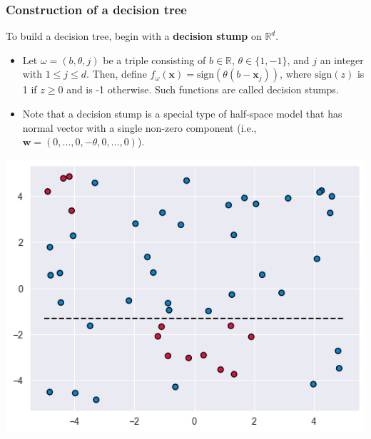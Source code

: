 \documentclass[smaller]{beamer}
\theoremstyle{example}
\newcommand{\x}{\textbf{x}}
\begin{document}
\begin{frame}
    \frametitle{Construction of a decision tree}
To build a decision tree, begin with a \textbf{decision stump} on $\mathbb R^d$. 

\begin{itemize}
    \item Let $\omega = (b, \theta, j)$ be a triple consisting of $b\in\mathbb R$, $\theta\in\{1,-1\}$, and $j$ an integer with $1\le j\le d$. Then, define $f_{\omega}(\x) = \textrm{sign}(\theta(b - \x_j))$, where $\textrm{sign}(z)$ is 1 if $z\ge 0$ and is -1 otherwise. Such functions are called decision stumps.
    \item Note that a decision stump is a special type of half-space model that has normal vector with a single non-zero component (i.e., $\textbf{w} = (0,\ldots,0,-\theta,0,\ldots,0)$). 
\end{itemize}

\centering
\includegraphics[height=0.3\textheight]{../../Images/decision_stump.png}
\end{frame}
\end{document}
